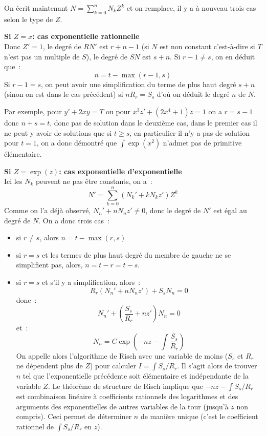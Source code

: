 \documentclass[a4paper,11pt]{book}
\begin{document}
\begin{giacjshere}
On \'ecrit maintenant $N=\sum_{k=0}^n N_k Z^k$ et on remplace, 
il y a \`a nouveau trois cas selon le type de $Z$.

{\bf Si $Z=x$: cas exponentielle rationnelle}\\
Donc $Z'=1$, le degré de $RN'$ est $r+n-1$ (si $N$ est non constant
c'est-à-dire si $T$ n'est pas un multiple de $S$), le degré de
$SN$ est $s+n$. Si $r-1\neq s$, on en déduit que~:
\[ n=t-\max(r-1,s)\]
Si $r-1=s$, on peut avoir
une simplification du terme de plus haut degré $s+n$ (sinon
on est dans le cas précédent) si $n R_r =S_s $
d'où on déduit le degré $n$ de $N$.

Par exemple, pour $y'+2xy=T$ ou pour $x^3z'+(2x^4+1)z=1$ on a $r=s-1$ donc
$n+s=t$, donc pas de solution dans le deuxième cas, dans le premier cas
il ne peut y avoir de solutions que si $t \geq s$, en particulier
il n'y a pas de solution pour $t=1$, on a donc démontré que $\int \exp(x^2)$
n'admet pas de primitive élémentaire.

{\bf Si $Z=\exp(z)$: cas exponentielle d'exponentielle}\\
Ici les $N_k$ peuvent ne pas être constants, on a~:
\[ N'=\sum_{k=0}^n (N_k'+kN_k z') Z^k\]
Comme on l'a déjà observé, $N_n'+n N_n z'\neq 0$, donc le
degré de $N'$ est égal au degré de $N$. On a donc trois cas~:
\begin{itemize} 
\item si $r\neq s$, alors $n=t-\max(r,s)$
\item si $r=s$ et les termes de plus haut degré du membre de gauche ne
se simplifient pas, alors, $n=t-r=t-s$.
\item si $r=s$ et s'il y a simplification, alors~:
\[ R_r(N_n'+nN_nz')+S_sN_n=0 \]
donc~:
\[ N_n' + (\frac{S_s}{R_r}+nz')N_n = 0\]
et~:
\[ N_n = C \exp(-nz-\int \frac{S_s}{R_r}) \]
On appelle alors l'algorithme de Risch avec une variable de moins ($S_s$
et $R_r$ ne dépendent plus de $Z$) pour calculer $I=\int S_s/R_r$. 
Il s'agit alors de trouver $n$ tel que l'exponentielle précédente
soit élémentaire et indépendante de la variable $Z$. Le théorème
de structure de Risch implique que $-nz-\int S_s/R_r$ est combinaison 
linéaire à coefficients rationnels des logarithmes et des arguments 
des exponentielles de autres variables de la tour (jusqu'à $z$ non compris).
Ceci permet de déterminer $n$ de manière unique (c'est le coefficient
rationnel de $\int S_s/R_r$ en $z$).
\end{itemize}


\end{giacjshere}
\end{document}
